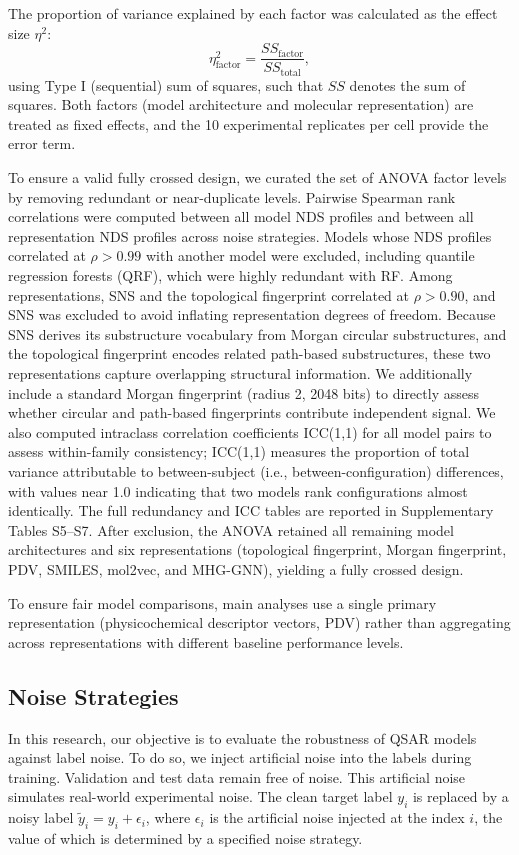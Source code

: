 \documentclass[pdflatex,sn-mathphys-num]{sn-jnl}%
\theoremstyle{thmstyleone}%
\theoremstyle{thmstyletwo}%
\theoremstyle{thmstylethree}%
\begin{document}
The proportion of variance explained by each factor was calculated as the effect size $\eta^2$:
$$
\eta^2_{\text{factor}} = \frac{SS_{\text{factor}}}{SS_{\text{total}}},
$$
using Type I (sequential) sum of squares, such that $SS$ denotes the sum of squares. Both factors (model architecture and molecular representation) are treated as fixed effects, and the 10 experimental replicates per cell provide the error term.

To ensure a valid fully crossed design, we curated the set of ANOVA factor levels by removing redundant or near-duplicate levels. Pairwise Spearman rank correlations were computed between all model NDS profiles and between all representation NDS profiles across noise strategies. Models whose NDS profiles correlated at $\rho > 0.99$ with another model were excluded, including quantile regression forests (QRF), which were highly redundant with RF. Among representations, SNS and the topological fingerprint correlated at $\rho > 0.90$, and SNS was excluded to avoid inflating representation degrees of freedom. Because SNS derives its substructure vocabulary from Morgan circular substructures, and the topological fingerprint encodes related path-based substructures, these two representations capture overlapping structural information. We additionally include a standard Morgan fingerprint (radius 2, 2048 bits) to directly assess whether circular and path-based fingerprints contribute independent signal. We also computed intraclass correlation coefficients ICC(1,1) for all model pairs to assess within-family consistency; ICC(1,1) measures the proportion of total variance attributable to between-subject (i.e., between-configuration) differences, with values near 1.0 indicating that two models rank configurations almost identically. The full redundancy and ICC tables are reported in Supplementary Tables S5--S7. After exclusion, the ANOVA retained all remaining model architectures and six representations (topological fingerprint, Morgan fingerprint, PDV, SMILES, mol2vec, and MHG-GNN), yielding a fully crossed design.

To ensure fair model comparisons, main analyses use a single primary representation (physicochemical descriptor vectors, PDV) rather than aggregating across representations with different baseline performance levels.

\subsection{Noise Strategies}
In this research, our objective is to evaluate the robustness of QSAR models against label noise. To do so, we inject artificial noise into the labels during training. Validation and test data remain free of noise. This artificial noise simulates real-world experimental noise. The clean target label $y_i$ is replaced by a noisy label $\tilde{y}_i = y_i + \epsilon_i$, where $\epsilon_i$ is the artificial noise injected at the index $i$, the value of which is determined by a specified noise strategy.  
\end{document}

